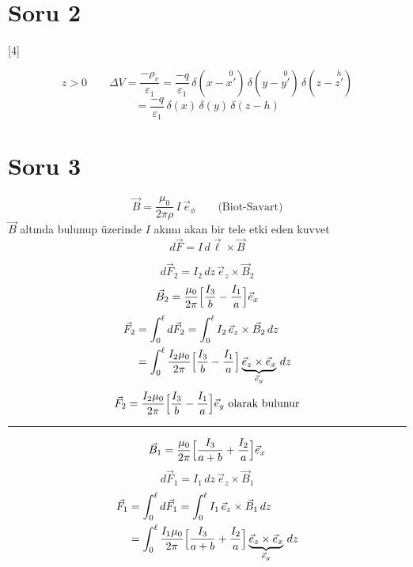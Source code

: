 \documentclass[11pt,a4paper]{article}
\begin{document}
\section{Soru 2}

[4]

\[ z>0\qquad \Delta V=\frac{-\rho_v}{\varepsilon_1}=\frac{-q}{\varepsilon_1}\,\delta(x-\overset{0}{x'})\,\delta(y-\overset{0}{y'})\,\delta(z-\overset{h}{z'}) \]
\[ =\frac{-q}{\varepsilon_1}\,\delta(x)\,\delta(y)\,\delta(z-h) \]

\section{Soru 3}

\[ \vec B=\frac{\mu_0}{2\pi\rho}\,I\,\vec e_\phi \qquad\text{(Biot-Savart)} \]
$\vec B$ altında bulunup üzerinde $I$ akımı akan bir tele etki eden kuvvet
\[ d\vec F=I\,d\vec\ell\times\vec B \]

\[ d\vec F_2=I_2\,dz\,\vec e_z\times\vec B_2 \]
\[ \vec B_2=\frac{\mu_0}{2\pi}\Bigl[\frac{I_3}{b}-\frac{I_1}{a}\Bigr]\vec e_x \]
\begin{align*}
\vec F_2 &= \int_0^{\ell}d\vec F_2=\int_0^{\ell}I_2\,\vec e_z\times\vec B_2\,dz\\
&= \int_0^{\ell}\frac{I_2\mu_0}{2\pi}\Bigl[\frac{I_3}{b}-\frac{I_1}{a}\Bigr]\underbrace{\vec e_z\times\vec e_x}_{\vec e_y}\,dz
\end{align*}
\[ \vec F_2=\frac{I_2\mu_0}{2\pi}\Bigl[\frac{I_3}{b}-\frac{I_1}{a}\Bigr]\vec e_y\ \text{olarak bulunur} \]

\par\noindent\rule{\linewidth}{0.4pt}\par

\[ \vec B_1=\frac{\mu_0}{2\pi}\Bigl[\frac{I_3}{a+b}+\frac{I_2}{a}\Bigr]\vec e_x \]
\[ d\vec F_1=I_1\,dz\,\vec e_z\times\vec B_1 \]
\begin{align*}
\vec F_1 &= \int_0^{\ell}d\vec F_1=\int_0^{\ell}I_1\,\vec e_z\times\vec B_1\,dz\\
&= \int_0^{\ell}\frac{I_1\mu_0}{2\pi}\Bigl[\frac{I_3}{a+b}+\frac{I_2}{a}\Bigr]\underbrace{\vec e_z\times\vec e_x}_{\vec e_y}\,dz
\end{align*}
\end{document}
